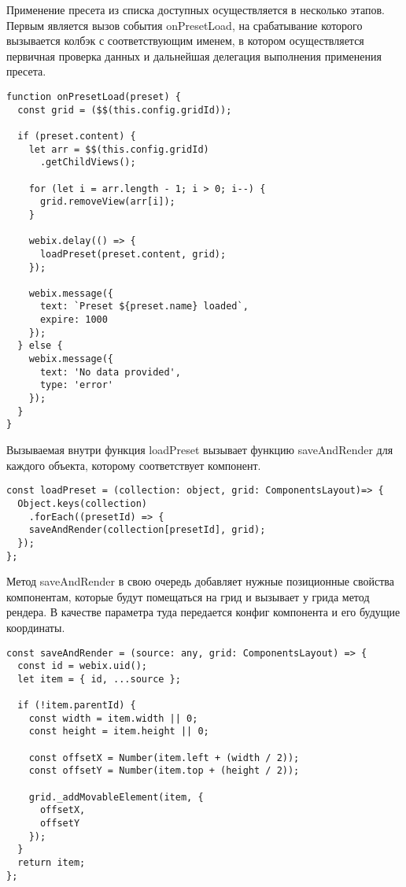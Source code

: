 Применение пресета из списка доступных осуществляется в несколько этапов. 
Первым является вызов события onPresetLoad, на срабатывание которого вызывается колбэк с соответствующим именем, в котором осуществляется первичная проверка данных и дальнейшая делегация выполнения применения пресета.

\begin{lstlisting}
function onPresetLoad(preset) {
  const grid = ($$(this.config.gridId));

  if (preset.content) {
    let arr = $$(this.config.gridId)
      .getChildViews();

    for (let i = arr.length - 1; i > 0; i--) {
      grid.removeView(arr[i]);
    }

    webix.delay(() => {
      loadPreset(preset.content, grid);
    });

    webix.message({
      text: `Preset ${preset.name} loaded`,
      expire: 1000
    });
  } else {
    webix.message({
      text: 'No data provided',
      type: 'error'
    });
  }
}
\end{lstlisting}

Вызываемая внутри функция loadPreset вызывает функцию saveAndRender для каждого объекта, которому соответствует компонент.

\begin{lstlisting}  
const loadPreset = (collection: object, grid: ComponentsLayout)=> {
  Object.keys(collection)
    .forEach((presetId) => {
    saveAndRender(collection[presetId], grid);
  });
};    
\end{lstlisting}

Метод saveAndRender в свою очередь добавляет нужные позиционные свойства компонентам, которые будут помещаться на грид и вызывает у грида метод рендера. В качестве параметра туда передается конфиг компонента и его будущие координаты.

\begin{lstlisting}
const saveAndRender = (source: any, grid: ComponentsLayout) => {
  const id = webix.uid();
  let item = { id, ...source };
  
  if (!item.parentId) {
    const width = item.width || 0;
    const height = item.height || 0;
  
    const offsetX = Number(item.left + (width / 2));
    const offsetY = Number(item.top + (height / 2));
  
    grid._addMovableElement(item, {
      offsetX,
      offsetY
    });
  }
  return item;
};
\end{lstlisting}

